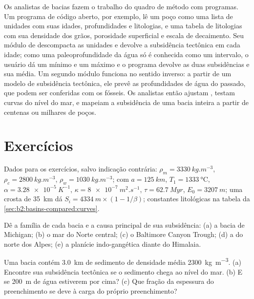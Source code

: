 \begin{inthelab}
Os analistas de bacias fazem o trabalho do quadro de método com programas. Um programa de código aberto, por
exemplo, lê um poço como uma lista de unidades com suas idades, profundidades e litologias, e uma
tabela de litologias com sua densidade dos grãos, porosidade superficial e escala de decaimento. Seu
módulo de  descompacta as unidades e devolve a subsidência tectônica em cada idade;
como uma paleoprofundidade da água só é conhecida como um intervalo, o usuário dá um mínimo e um máximo e
o programa devolve as duas subsidências e sua média. Um segundo módulo funciona no sentido inverso:
a partir de um modelo de subsidência tectônica, ele prevê as profundidades de água do passado, que podem ser
conferidas com os fósseis. Os analistas então ajustam , testam curvas do nível do mar, e
mapeiam a subsidência de uma bacia inteira a partir de centenas ou milhares de poços.
\end{inthelab}

\section*{Exercícios}\label{sec:b2:basins-compared:exercises}

Dados para os exercícios, salvo indicação contrária: $\rho_m = \qty{3330}{kg.m^{-3}}$, $\rho_c =
\qty{2800}{kg.m^{-3}}$, $\rho_w = \qty{1030}{kg.m^{-3}}$;  com $a =
\qty{125}{km}$, $T_1 = \qty{1333}{\celsius}$, $\alpha = \qty{3.28e-5}{K^{-1}}$, $\kappa =
\qty{8e-7}{m^2.s^{-1}}$, $\tau = \qty{62.7}{Myr}$, $E_0 = \qty{3207}{m}$; uma crosta de \qty{35}{km}
dá $S_i = \qty{4334}{m}\times(1 - 1/\beta)$; constantes litológicas na tabela da
\cref{sec:b2:basins-compared:curves}.

\begin{exercise}[$\star$]\label{exo:b2:basins-compared:1}
Dê a família de cada bacia e a causa principal de sua subsidência: (a) a bacia de Michigan;
(b) o mar do Norte central; (c) o Baltimore Canyon Trough; (d) a  do norte dos Alpes;
(e) a planície indo-gangética diante do Himalaia.
\end{exercise}

\begin{exercise}[$\star$]\label{exo:b2:basins-compared:2}
Uma bacia contém \qty{3.0}{km} de sedimento de densidade média \qty{2300}{kg.m^{-3}}. (a) Encontre sua
subsidência tectônica se o sedimento chega ao nível do mar. (b) E se \qty{200}{m} de água estiverem por
cima? (c) Que fração da espessura do preenchimento se deve à carga do próprio preenchimento?
\end{exercise}

